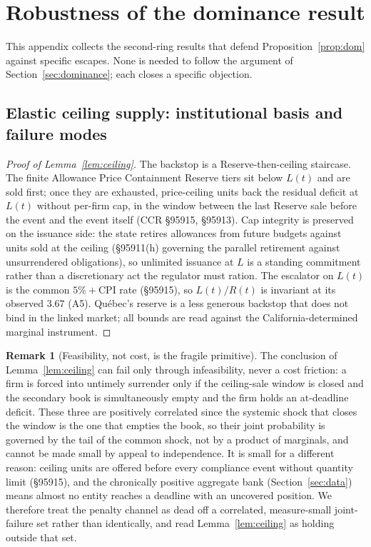 \documentclass[11pt,letterpaper]{article}
\theoremstyle{plain}
\theoremstyle{definition}
\newtheorem{remark}[theorem]{Remark}
\numberwithin{equation}{section}
\begin{document}
\section{Robustness of the dominance result}\label{app:dominance}

This appendix collects the second-ring results that defend Proposition~\ref{prop:dom} against specific escapes. None is needed to follow the argument of Section~\ref{sec:dominance}; each closes a specific objection.

\subsection{Elastic ceiling supply: institutional basis and failure modes}

\begin{proof}[Proof of Lemma~\ref{lem:ceiling}]
The backstop is a Reserve-then-ceiling staircase. The finite Allowance Price Containment Reserve tiers sit below $L(t)$ and are sold first; once they are exhausted, price-ceiling units back the residual deficit at $L(t)$ without per-firm cap, in the window between the last Reserve sale before the event and the event itself (CCR \S95915, \S95913). Cap integrity is preserved on the issuance side: the state retires allowances from future budgets against units sold at the ceiling (\S95911(h) governing the parallel retirement against unsurrendered obligations), so unlimited issuance at $L$ is a standing commitment rather than a discretionary act the regulator must ration. The escalator on $L(t)$ is the common $5\%+\mathrm{CPI}$ rate (\S95915), so $L(t)/R(t)$ is invariant at its observed $3.67$ (A5). Qu\'ebec's reserve is a less generous backstop that does not bind in the linked market; all bounds are read against the California-determined marginal instrument.
\end{proof}

\begin{remark}[Feasibility, not cost, is the fragile primitive]\label{rem:feasibility_fragile}
The conclusion of Lemma~\ref{lem:ceiling} can fail only through infeasibility, never a cost friction: a firm is forced into untimely surrender only if the ceiling-sale window is closed and the secondary book is simultaneously empty and the firm holds an at-deadline deficit. These three are positively correlated since the systemic shock that closes the window is the one that empties the book, so their joint probability is governed by the tail of the common shock, not by a product of marginals, and cannot be made small by appeal to independence. It is small for a different reason: ceiling units are offered before every compliance event without quantity limit (\S95915), and the chronically positive aggregate bank (Section~\ref{sec:data}) means almost no entity reaches a deadline with an uncovered position. We therefore treat the penalty channel as dead off a correlated, measure-small joint-failure set rather than identically, and read Lemma~\ref{lem:ceiling} as holding outside that set.
\end{remark}
\end{document}
